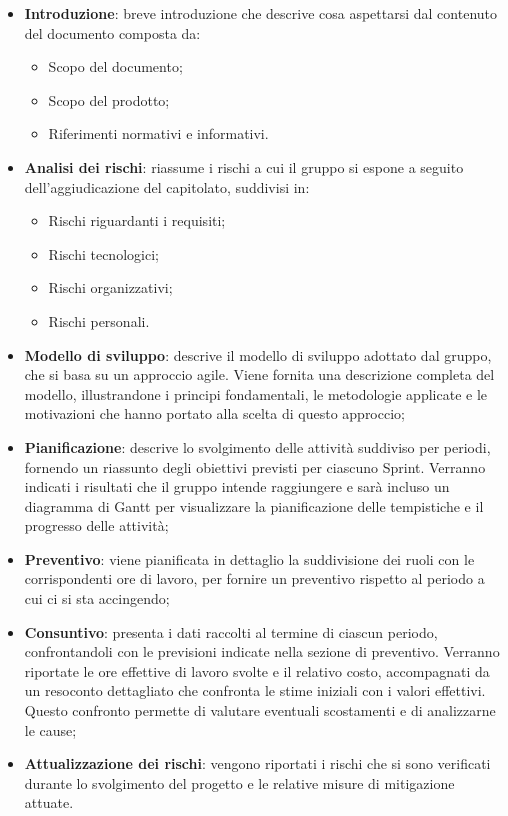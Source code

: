\begin{itemize}
\begin{itemize}
                  \item \textbf{Introduzione}: breve introduzione che descrive cosa aspettarsi dal contenuto del documento composta da:
                        \begin{itemize}
                              \item Scopo del documento;
                              \item Scopo del prodotto;
                              \item Riferimenti normativi e informativi.
                        \end{itemize}
                  \item \textbf{Analisi dei rischi}: riassume i rischi a cui il gruppo si espone a seguito dell'aggiudicazione del capitolato, suddivisi in:
                        \begin{itemize}
                              \item Rischi riguardanti i requisiti;
                              \item Rischi tecnologici;
                              \item Rischi organizzativi;
                              \item Rischi personali.
                        \end{itemize}
                  \item \textbf{Modello di sviluppo}: descrive il modello di sviluppo adottato dal gruppo, che si basa su un approccio agile. Viene fornita una descrizione completa del modello, illustrandone i principi fondamentali, le metodologie applicate e le motivazioni che hanno portato alla scelta di questo approccio;
                  \item \textbf{Pianificazione}: descrive lo svolgimento delle attività suddiviso per periodi, fornendo un riassunto degli obiettivi previsti per ciascuno Sprint. Verranno indicati i risultati che il gruppo intende raggiungere e sarà incluso un diagramma di Gantt per visualizzare la pianificazione delle tempistiche e il progresso delle attività;
                  \item \textbf{Preventivo}: viene pianificata in dettaglio la suddivisione dei ruoli con le corrispondenti ore di lavoro, per fornire un preventivo rispetto al periodo a cui ci si sta accingendo;
                  \item \textbf{Consuntivo}: presenta i dati raccolti al termine di ciascun periodo, confrontandoli con le previsioni indicate nella sezione di preventivo. Verranno riportate le ore effettive di lavoro svolte e il relativo costo,
                        accompagnati da un resoconto dettagliato che confronta le stime iniziali con i valori effettivi. Questo confronto permette di valutare eventuali scostamenti e di analizzarne le cause;
                  \item \textbf{Attualizzazione dei rischi}: vengono riportati i rischi che si sono verificati durante lo svolgimento del progetto e le relative misure di mitigazione attuate.
            \end{itemize}


\end{itemize}
